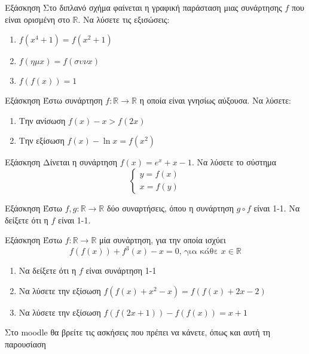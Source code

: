 \documentclass[greek]{beamer}
\begin{document}
\begin{frame}{Εξάσκηση}
 Στο διπλανό σχήμα φαίνεται η γραφική παράσταση μιας συνάρτησης $f$ που είναι ορισμένη στο $\mathbb{R}$. Να λύσετε τις εξισώσεις:
 \begin{enumerate}
  \item $f(x^4+1)=f(x^2+1)$ \pause
  \item $f(ημ x)=f(συν x)$ \pause
  \item $f\left( f(x) \right)=1$
 \end{enumerate}
\end{frame}

\begin{frame}{Εξάσκηση}
 Έστω συνάρτηση $f:\mathbb{R}\to \mathbb{R}$ η οποία είναι γνησίως αύξουσα. Να λύσετε:
 \begin{enumerate}
  \item Την ανίσωση $f(x)-x>f(2x)$ \pause
  \item Την εξίσωση $f(x)-\ln x=f(x^2)$
 \end{enumerate}
\end{frame}

\begin{frame}{Εξάσκηση}
 Δίνεται η συνάρτηση $f(x)=e^x+x-1$. Να λύσετε το σύστημα
 $$\begin{cases}
   y=f(x) \\
   x=f(y)
  \end{cases}$$
\end{frame}

\begin{frame}{Εξάσκηση}
 Έστω $f,g:\mathbb{R}\to\mathbb{R}$ δύο συναρτήσεις, όπου η συνάρτηση $g\circ f$ είναι 1-1. Να δείξετε ότι η $f$ είναι 1-1.
\end{frame}

\begin{frame}{Εξάσκηση}
 Έστω $f:\mathbb{R}\to\mathbb{R}$ μία συνάρτηση, για την οποία ισχύει
 $$f\left(f(x)\right)+f^3(x)-x=0\text{, για κάθε }x\in\mathbb{R}$$
 \begin{enumerate}
  \item Να δείξετε ότι η $f$ είναι συνάρτηση 1-1 \pause
  \item Να λύσετε την εξίσωση $f\left(f(x)+x^2-x\right)=f\left(f(x)+2x-2\right)$ \pause
  \item Να λύσετε την εξίσωση $f\left(f(2x+1)\right)-f\left(f(x)\right)=x+1$
 \end{enumerate}
\end{frame}

\begin{frame}
 Στο moodle θα βρείτε τις ασκήσεις που πρέπει να κάνετε, όπως και αυτή τη παρουσίαση
\end{frame}
\end{document}
